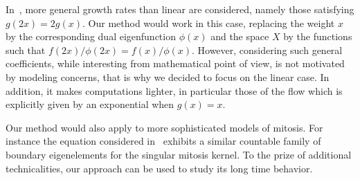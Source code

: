 \documentclass[10pt]{amsart}
\theoremstyle{definition}\newtheorem{defi}[theo]{Definition}\newtheorem{rema}[theo]{Remark}\newtheorem{exam}[theo]{Example}\newtheorem{exem}[theo]{Example}\newtheorem{nota}[theo]{Notation}
\newcommand{\1}{\mathds{1}}
\begin{document}
In~\cite{GreinerNagel}, more general growth rates than linear are considered, namely those satisfying $g(2x)=2g(x).$ Our method would work in this case, replacing the weight $x$ by the corresponding dual eigenfunction $\phi(x)$ and the space $X$ by the functions such that $f(2x)/\phi(2x)=f(x)/\phi(x)$. However, considering such general coefficients, while interesting from mathematical point of view, is not motivated by modeling concerns, that is why we decided to focus on the linear case. In addition, it makes computations lighter, in particular those of the flow which is explicitly given by an exponential when $g(x) = x$.


Our method would also apply to more sophisticated models of mitosis. For instance the equation considered in~\cite{Gabriel2019} exhibits a similar countable family of boundary eigenelements for the singular mitosis kernel. To the prize of additional technicalities, our approach can be used to study its long time behavior.

\vspace{80pt} 
\end{document}
